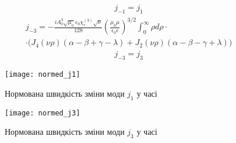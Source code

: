 %
\begin{equation} \begin{aligned}
j_{-1} = j_{1}
\end{aligned} \end{equation}
%
%
\begin{equation*} \begin{aligned}
j_{-3} = - \frac{i A_0^3 \sqrt{\mu_0} \epsilon_0 \chi_e^{(3)} \sqrt{\nu}}{128}
\left( \frac{\mu_0 \mu}{\epsilon_0 \epsilon} \right)^{3/2}
\int_0^\infty \rho d \rho \cdot \\ \cdot
\Big( J_4 (\nu \rho) ( \alpha - \beta + \gamma - \lambda) + 
J_2 (\nu \rho) ( \alpha - \beta - \gamma + \lambda) \Big)
\end{aligned} \end{equation*}
%
\begin{equation} \begin{aligned}
j_{-3} = j_{3}
\end{aligned} \end{equation}

\begin{figure}[htbp] \begin{center}
\texttt{[image: normed\_j1]}
\caption{Нормована швидкість зміни моди $ j_1 $ у часі} \label{fig:mode1}
\end{center} \end{figure}

\begin{figure}[htbp] \begin{center}
\texttt{[image: normed\_j3]}
\caption{Нормована швидкість зміни моди $ j_3 $ у часі} \label{fig:mode3}
\end{center} \end{figure}

